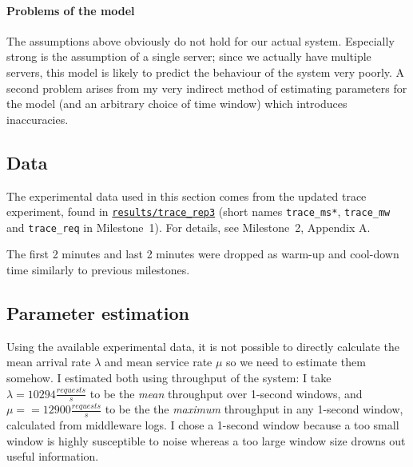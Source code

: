 \documentclass[11pt]{article}
\begin{document}
\paragraph{Problems of the model}
The assumptions above obviously do not hold for our actual system. Especially strong is the assumption of a single server; since we actually have multiple servers, this model is likely to predict the behaviour of the system very poorly. A second problem arises from my very indirect method of estimating parameters for the model (and an arbitrary choice of time window) which introduces inaccuracies.


\subsection{Data}

The experimental data used in this section comes from the updated trace experiment, found in \texttt{\href{https://gitlab.inf.ethz.ch/pungast/asl-fall16-project/tree/master/results/trace\_rep3}{results/trace\_rep3}} (short names \texttt{trace\_ms*}, \texttt{trace\_mw} and \texttt{trace\_req} in Milestone~1). For details, see Milestone~2, Appendix A.

The first 2 minutes and last 2 minutes were dropped as warm-up and cool-down time similarly to previous milestones.
 
\subsection{Parameter estimation}

Using the available experimental data, it is not possible to directly calculate the mean arrival rate $\lambda$ and mean service rate $\mu$ so we need to estimate them somehow. I estimated both using throughput of the system: I take $\lambda = 10294 \frac{requests}{s}$ to be the \emph{mean} throughput over 1-second windows, and $\mu =  = 12900 \frac{requests}{s}$ to be the the \emph{maximum} throughput in any 1-second window, calculated from middleware logs. I chose a 1-second window because a too small window is highly susceptible to noise whereas a too large window size drowns out useful information.

\end{document}
